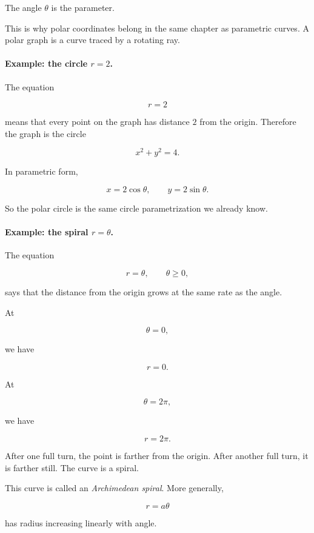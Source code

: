 The angle \(\theta\) is the parameter.

This is why polar coordinates belong in the same chapter as parametric curves.  A polar
graph is a curve traced by a rotating ray.

\paragraph{Example: the circle \(r=2\).}
The equation

\[
r=2
\]

means that every point on the graph has distance \(2\) from the origin.  Therefore the
graph is the circle

\[
x^2+y^2=4.
\]

In parametric form,

\[
x=2\cos\theta,
\qquad
y=2\sin\theta.
\]

So the polar circle is the same circle parametrization we already know.

\paragraph{Example: the spiral \(r=\theta\).}
The equation

\[
r=\theta,
\qquad
\theta\ge0,
\]

says that the distance from the origin grows at the same rate as the angle.

At

\[
\theta=0,
\]

we have

\[
r=0.
\]

At

\[
\theta=2\pi,
\]

we have

\[
r=2\pi.
\]

After one full turn, the point is farther from the origin.  After another full turn, it is
farther still.  The curve is a spiral.

This curve is called an \emph{Archimedean spiral}.  More generally,

\[
r=a\theta
\]

has radius increasing linearly with angle.

